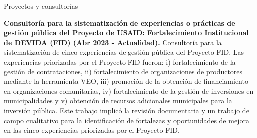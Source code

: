\documentclass{resume} %
\begin{document}
\begin{rSection}{Proyectos y consultorías}
\item \textbf{Consultoría para la sistematización de experiencias o prácticas de gestión pública del Proyecto de USAID: Fortalecimiento Institucional de DEVIDA (FID) (Abr 2023 - Actualidad).} {Consultoría para la sistematización de cinco experiencias de gestión pública del Proyecto FID. Las experiencias priorizadas por el Proyecto FID fueron: i) fortalecimiento de la gestión de contrataciones, ii) fortalecimiento de organizaciones de productores mediante la herramienta VEO, iii) promoción de la obtención de financiamiento en organizaciones comunitarias, iv) fortalecimiento de la gestión de inversiones en municipalidades y v) obtención de recursos adicionales municipales para la inversión pública.  Este trabajo implicó la revisión documentaria y un trabajo de campo cualitativo para la identificación de fortalezas y oportunidades de mejora en las cinco experiencias priorizadas por el Proyecto FID. }
\end{rSection} 
\pagebreak
\end{document}
